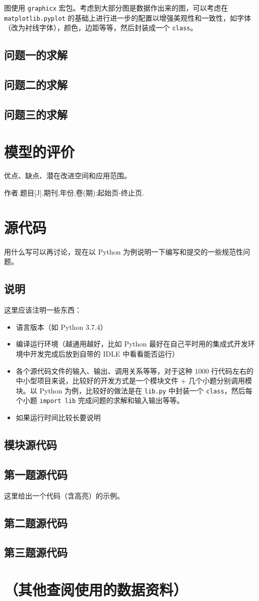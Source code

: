 \documentclass{ctexart}
\begin{document}
图使用 \verb|graphicx| 宏包。考虑到大部分图是数据作出来的图，可以考虑在 \verb|matplotlib.pyplot| 的基础上进行进一步的配置以增强美观性和一致性，如字体（改为衬线字体），颜色，边距等等，然后封装成一个 \verb|class|。
\subsection{问题一的求解}
\subsection{问题二的求解}
\subsection{问题三的求解}
\newpage
\section{模型的评价}
优点、缺点、潜在改进空间和应用范围。
\newpage
\begin{thebibliography}{100}
 作者.题目[J].期刊,年份,卷(期):起始页-终止页.
\end{thebibliography}
\newpage
\appendix
\section{源代码}
用什么写可以再讨论，现在以 Python 为例说明一下编写和提交的一些规范性问题。
\subsection{说明}
这里应该注明一些东西：
\begin{itemize}
    \item 语言版本（如 Python 3.7.4）
    \item 编译运行环境（越通用越好，比如 Python 最好在自己平时用的集成式开发环境中开发完成后放到自带的 IDLE 中看看能否运行）
    \item 各个源代码文件的输入、输出、调用关系等等，对于这种 1000 行代码左右的中小型项目来说，比较好的开发方式是一个模块文件 + 几个小题分别调用模块。以 Python 为例，比较好的做法是在 \verb|lib.py| 中封装一个 \verb|class|，然后每个小题 \verb|import lib| 完成问题的求解和输入输出等等。
    \item 如果运行时间比较长要说明
\end{itemize}
\subsection{模块源代码}
\subsection{第一题源代码}
这里给出一个代码（含高亮）的示例。

\subsection{第二题源代码}
\subsection{第三题源代码}
\newpage
\section{（其他查阅使用的数据资料）}
\end{document}
